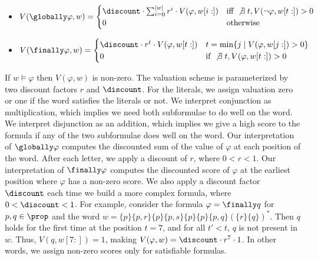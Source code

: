\begin{itemize}
    \item $V(\globally \varphi, w) = \begin{cases}
        \discount \cdot \sum_{i = 0}^{|w|} r^{i} \cdot V(\varphi, w[i:]) & \textnormal{iff } \not \exists\; t, V(\neg\varphi, w[t:]) > 0 \\ 
        0 & \textnormal{otherwise}
    \end{cases}$
    \item $V(\finally \varphi, w) = \begin{cases}
        \discount \cdot r^{t} \cdot V(\varphi, w[t:]) & t = \min \{j \mid V(\varphi, w[j:]) > 0\} \\ 
        0 & \textnormal{if } \not \exists\; t, V(\varphi, w[t:]) > 0
    \end{cases}$
             
%
%
\end{itemize}
If $w \models \varphi$ then $V(\varphi,w)$ is non-zero.
%
The valuation scheme is parameterized by two discount factors $r$ and $\discount$.
%
%
For the literals, we assign valuation zero or one if the word satisfies
the literals or not.
%
We interpret conjunction as multiplication, which implies we need both subformulae
to do well on the word.
%
We interpret disjunction as an addition, which implies we give a high score to the formula
if any of the two subformulae does well on the word.
%
Our interpretation of $\globally \varphi$ computes the discounted sum of the value of $\varphi$
at each position of the word.
After each letter, we apply a discount of $r$, where $0< r < 1$.
%
Our interpretation of $\finally \varphi$ computes the discounted score of $\varphi$
at the earliest position where $\varphi$ has a non-zero score.
%
We also apply a discount factor $\discount$ each time we build a more complex formula,
where $0 < \discount < 1$.
%
For example, consider the
formula $\varphi=\finally q$ for $p, q \in \prop$ and the word
$w=\{p\}\{p,r\}\{p\}\{p,s\}\{p\}\{p\}\{p,q\}(\{r\}\{q\})^*$. Then $q$ holds for
the first time at the position $t=7$, and for all $t' < t$, $q$ is not present
in $w$. Thus, $V(q,w[7:])=1$, making $V(\varphi, w)=\discount\cdot r^{7}\cdot 1$.
 In other words, we
assign non-zero scores only for satisfiable formulas.

